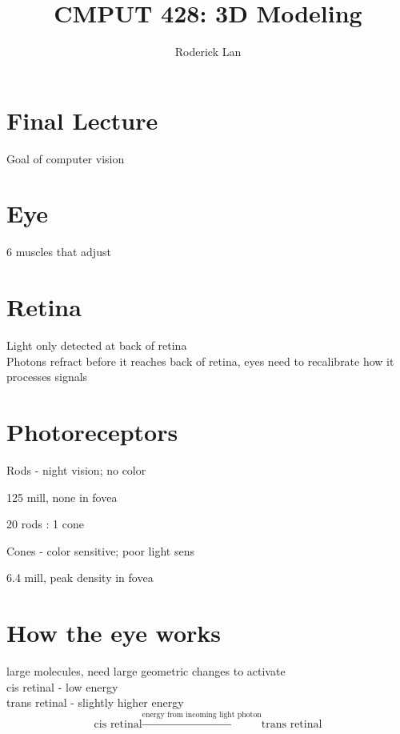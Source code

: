 \documentclass{article}
\title{CMPUT 428: 3D Modeling}
\author{Roderick Lan}
\date{}
\begin{document}
\makeatother
{}

\maketitle
\tableofcontents
\break
\section*{Final Lecture}
Goal of computer vision
\section{Eye}
6 muscles that adjust

\section{Retina}
Light only detected at back of retina
\\
Photons refract before it reaches back of retina, eyes need to recalibrate
how it processes signals

\section{Photoreceptors}
Rods - night vision; no color
\begin{list}{}{}
  \item 125 mill, none in fovea
  \item 20 rods : 1 cone
\end{list}
Cones - color sensitive; poor light sens
\begin{list}{}{}
  \item 6.4 mill, peak density in fovea
\end{list}

\section{How the eye works}
large molecules, need large geometric changes to activate
\\
cis retinal - low energy
\\
trans retinal - slightly higher energy
\[
  \text{cis retinal} \xrightarrow{\text{energy from incoming light photon}}
  \text{trans retinal}
\]
\end{document}
